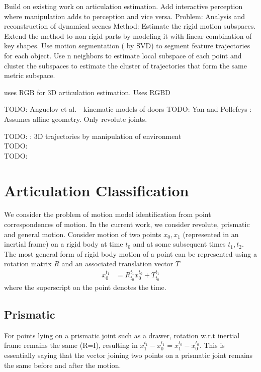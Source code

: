 \documentclass[conference]{IEEEtran}
\begin{document}
\cite{martin2014online} Build on existing work on articulation estimation. Add interactive perception where manipulation adds to perception and vice versa.
  \cite{yan2006automatic} 
    Problem: Analysis and reconstruction of dynamical scenes
    Method: Estimate the rigid motion subspaces. Extend the method to non-rigid
    parts by modeling it with linear combination of key shapes. Use motion
    segmentation ( by SVD) to segment feature trajectories for each object. Use
    n neighbors to estimate local subspace of each point and cluster the
    subspaces to estimate the cluster of trajectories that form the same metric subspace.

    \cite{katz2010interactive} uses RGB for 3D articulation estimation.
    \cite{katz2013interactive} Uses RGBD

 
TODO: Anguelov et al. - kinematic models of doors
TODO: Yan and Pollefeys : Assumes affine geometry. Only revolute joints.


TODO: \cite{sturm20103d} : 3D trajectories by manipulation of environment \\
TODO: \cite{huang2012occlusion} \\ 
TODO: \cite{Pillai-RSS-14} \\


\section{Articulation Classification} We consider the problem of motion model identification from point correspondences of motion. In the current work, we consider revolute, prismatic and general motion. Consider motion of two points $x_0,x_1$ (represented in an inertial frame) on a rigid body at time $t_0$ and at some subsequent times $t_1,t_2$. The most general form of rigid body motion of a point can be represented using a rotation matrix $R$ and an associated translation vector $T$
\begin{align}
x_0^{t_1}& = R_{t_0}^{t_1}x_0^{t_0}+T_{t_0}^{t_1}
\end{align}
where the superscript on the point denotes the time.
\subsection{Prismatic}
For points lying on a prismatic joint such as a drawer, rotation w.r.t inertial frame remains the same (R=I), resulting in $x_1^{t_1}-x_0^{t_1} = x_1^{t_0}-x_0^{t_0}$. This is essentially saying that the vector joining two points on a prismatic joint remains the same before and after the motion.
\end{document}
